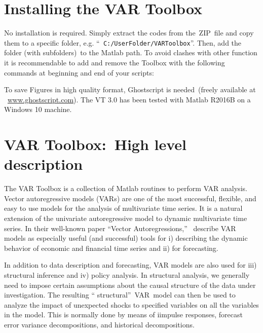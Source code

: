 \documentclass[10pt]{article}
\begin{document}
\section{Installing the VAR Toolbox}

No installation is required. Simply extract the codes from the\ ZIP\ file
and copy them to a specific folder, e.g. \textquotedblleft \texttt{%
C:/UserFolder/VARToolbox}\textquotedblright . Then, add the folder (with
subfolders)\ to the Matlab path. To avoid clashes with other function it is
recommendable to add and remove the Toolbox with the following commands at
beginning and end of your scripts:


To save Figures in high quality format, Ghostscript is needed\ (freely
available at \ \url{www.ghostscript.com}). The VT 3.0 has been tested with
Matlab R2016B on a Windows 10 machine.

\section{VAR Toolbox:\ High level description}

The VAR Toolbox is a collection of Matlab routines to perform VAR analysis.
Vector autoregressive models (VARs) are one of the most successful,
flexible, and easy to use models for the analysis of multivariate time
series. It is a natural extension of the univariate autoregressive model to
dynamic multivariate time series. In their well-known paper
\textquotedblleft Vector Autoregressions,\textquotedblright\ \cite%
{StockWatson2000} describe VAR models as especially useful (and successful)
tools for i) describing the dynamic behavior of economic and financial time
series and ii) for forecasting.

In addition to data description and forecasting, VAR models are also used
for iii) structural inference and iv) policy analysis. In structural
analysis, we generally need to impose certain assumptions about the causal
structure of the data under investigation. The resulting \textquotedblleft
structural\textquotedblright\ VAR\ model can then be used to analyze the
impact of unexpected shocks to specified variables on all the variables in
the model. This is normally done by means of {i{impulse responses}}, {%
forecast error variance decompositions}, and {historical decompositions}.
\end{document}
